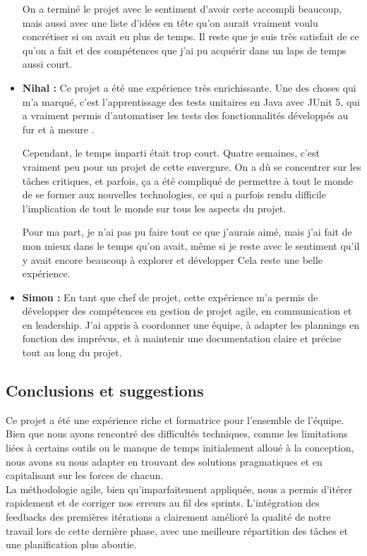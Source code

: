 \documentclass[a4paper]{article}
\begin{document}
\begin{itemize}
    On a terminé le projet avec le sentiment d’avoir certe accompli beaucoup, mais aussi avec une liste d’idées en tête qu’on aurait vraiment voulu concrétiser si on avait eu plus de temps. Il reste que je suis très satisfait de ce qu’on a fait et des compétences que j’ai pu acquérir dans un laps de temps aussi court.
    \item \textbf{Nihal : }Ce projet a été une expérience très enrichissante. Une des choses qui m’a marqué, c’est l’apprentissage des tests unitaires en Java avec JUnit 5, qui a vraiment permis d’automatiser les tests des fonctionnalités développés au fur et à mesure .

    Cependant, le temps imparti était trop court. Quatre semaines, c’est vraiment peu pour un projet de cette envergure. On a dû se concentrer sur les tâches critiques, et parfois, ça a été compliqué de permettre à tout le monde de se former aux nouvelles technologies, ce qui a parfois rendu difficile l’implication de tout le monde sur tous les aspects du projet.
    
    Pour ma part, je n’ai pas pu faire tout ce que j’aurais aimé, mais  j’ai fait de mon mieux dans le temps qu’on avait, même si je reste avec le sentiment qu’il y avait encore beaucoup à explorer et développer Cela reste une belle expérience.
    \item \textbf{Simon :} En tant que chef de projet, cette expérience m'a permis de développer des compétences en gestion de projet agile, en communication et en leadership. J'ai appris à coordonner une équipe, à adapter les plannings en fonction des imprévus, et à maintenir une documentation claire et précise tout au long du projet.
\end{itemize}


\subsection{Conclusions et suggestions}
Ce projet a été une expérience riche et formatrice pour l’ensemble de l’équipe. Bien que nous ayons rencontré des difficultés techniques, comme les limitations liées à certains outils ou le manque de temps initialement alloué à la conception, nous avons su nous adapter en trouvant des solutions pragmatiques et en capitalisant sur les forces de chacun. \\

La méthodologie agile, bien qu’imparfaitement appliquée, nous a permis d’itérer rapidement et de corriger nos erreurs au fil des sprints. L'intégration des feedbacks des premières itérations a clairement amélioré la qualité de notre travail lors de cette dernière phase, avec une meilleure répartition des tâches et une planification plus aboutie. \\
\end{document}
